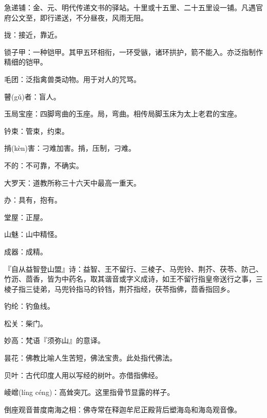\startbuffer[1265]
急递铺：金、元、明代传递文书的驿站。十里或十五里、二十五里设一铺。凡遇官府公文至，即行递送，不分昼夜，风雨无阻。
\stopbuffer


\startbuffer[1266]
拢：接近，靠近。
\stopbuffer


\startbuffer[1267]
锁子甲：一种铠甲。其甲五环相衔，一环受镞，诸环拱护，箭不能入。亦泛指制作精细的铠甲。
\stopbuffer


\startbuffer[1268]
毛团：泛指禽兽类动物。用于对人的咒骂。
\stopbuffer


\startbuffer[1269]
瞽(gǔ)者：盲人。
\stopbuffer


\startbuffer[1270]
玉局宝座：四脚弯曲的玉座。局，弯曲。相传局脚玉床为太上老君的宝座。
\stopbuffer


\startbuffer[1271]
钤束：管束，约束。
\stopbuffer


\startbuffer[1272]
掯(kèn)害：刁难加害。掯，压制，刁难。
\stopbuffer


\startbuffer[1273]
不的：不可靠，不确实。
\stopbuffer


\startbuffer[1274]
大罗天：道教所称三十六天中最高一重天。
\stopbuffer


\startbuffer[1275]
办：具有，抱有。
\stopbuffer


\startbuffer[1276]
堂屋：正屋。
\stopbuffer


\startbuffer[1277]
山魅：山中精怪。
\stopbuffer


\startbuffer[1278]
成器：成精。
\stopbuffer


\startbuffer[1279]
『自从益智登山盟』诗：益智、王不留行、三棱子、马兜铃、荆芥、茯苓、防己、竹沥、茴香，皆为中药名，取其谐音或字义成诗，如王不留行指皇帝送行之事，三棱子指三徒弟，马兜铃指马的铃铛，荆芥指经，茯苓指佛，茴香指回乡。
\stopbuffer


\startbuffer[1280]
钓纶：钓鱼线。
\stopbuffer


\startbuffer[1281]
松关：柴门。
\stopbuffer


\startbuffer[1282]
妙高：梵语『须弥山』的意译。
\stopbuffer


\startbuffer[1283]
昙花：佛教比喻人生苦短，佛法宝贵。此处指代佛法。
\stopbuffer


\startbuffer[1284]
贝叶：古代印度人用以写经的树叶。亦借指佛经。
\stopbuffer


\startbuffer[1285]
崚嶒(líng céng)：高耸突兀。这里指骨节显露的样子。
\stopbuffer


\startbuffer[1286]
倒座观音普度南海之相：佛寺常在释迦牟尼正殿背后塑海岛和海岛观音像。
\stopbuffer


